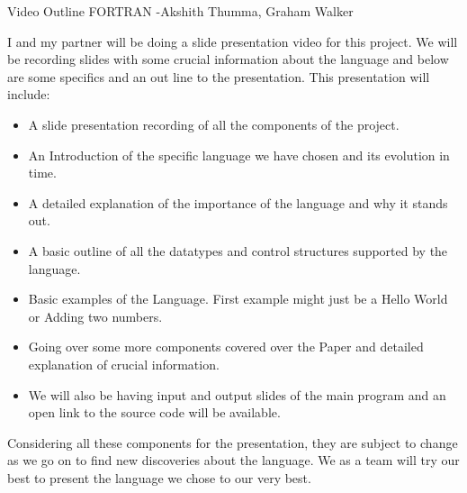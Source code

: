 \documentclass{article}
\begin{document}
Video Outline FORTRAN -Akshith Thumma, Graham Walker

I and my partner will be doing a slide presentation video for this project. We will be recording slides with some crucial information about the language and below are some specifics and an out line to the presentation. This presentation will include:

\begin{itemize}
\item A slide presentation recording of all the components of the project.
\item An Introduction of the specific language we have chosen and its evolution in time.
\item A detailed explanation of the importance of the language and why it stands out.
\item A basic outline of all the datatypes and control structures supported by the language.
\item Basic examples of the Language. First example might just be a Hello World or Adding two numbers.
\item Going over some more components covered over the Paper and detailed explanation of crucial information.
\item We will also be having input and output slides of the main program and an open link to the source code will be available.
\end{itemize}
Considering all these components for the presentation, they are subject to change as we go on to find new discoveries about the language. We as a team will try our best to present the language we chose to our very best. 
\end{document}
